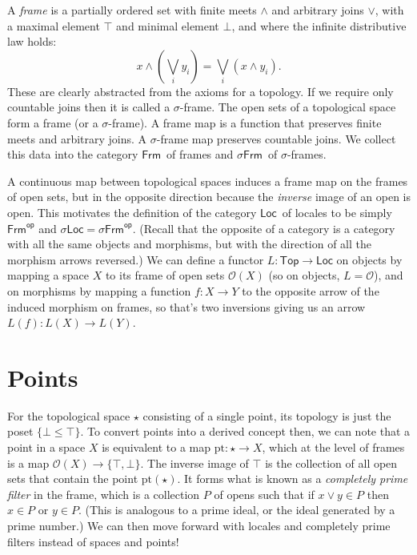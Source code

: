 \documentclass[12pt]{extarticle}
\newcommand{\op}[1]{#1^{\textsf{op}}}
\newcommand{\bottom}{\ensuremath{\bot}}
\newcommand{\Frm}{\ensuremath{\mathsf{Frm}}}
\newcommand{\sFrm}{\ensuremath{\mathsf{\sigma Frm}}}
\newcommand{\Locale}{\ensuremath{\mathsf{Loc}}}
\newcommand{\Topcat}{\ensuremath{\mathsf{Top}}}
\newcommand{\slocale}{\ensuremath{\mathsf{\sigma Loc}}}
\renewcommand{\o}{\ensuremath{\mathcal{O}}}
\begin{document}
A \emph{frame} is a partially ordered set with finite meets $\wedge$ and arbitrary joins $\vee$, with a maximal element $\top$ and minimal element $\bottom$, and where the infinite distributive law holds: $$x \wedge (\bigvee_i y_i)=\bigvee_i (x\wedge y_i).$$ These are clearly abstracted from the axioms for a topology. If we require only countable joins then it is called a $\sigma$-frame. The open sets of a topological space form a frame (or a $\sigma$-frame). A frame map is a function that preserves finite meets and arbitrary joins. A $\sigma$-frame map preserves countable joins. We collect this data into the category \Frm\ of frames and \sFrm\ of $\sigma$-frames.

A continuous map between topological spaces induces a frame map on the frames of open sets, but in the opposite direction because the \emph{inverse} image of an open is open. This motivates the definition of the category \Locale\ of locales to be simply $\op{\Frm}$ and $\slocale=\op{\sFrm}$. (Recall that the opposite of a category is a category with all the same objects and morphisms, but with the direction of all the morphism arrows reversed.) We can define a functor $L:\Topcat\to\Locale$ on objects by mapping a space $X$ to its frame of open sets $\o(X)$ (so on objects, $L=\o$), and on morphisms by mapping a function $f:X\to Y$ to the opposite arrow of the induced morphism on frames, so that's two inversions giving us an arrow $L(f):L(X)\to L(Y)$. 

\section{Points}

For the topological space $\star$ consisting of a single point, its topology is just the poset $\{\bot \leq \top\}$. To convert points into a derived concept then, we can note that a point in a space $X$ is equivalent to a map $\mathrm{pt}:\star\to X$, which at the level of frames is a map $\o(X)\to\{\top, \bot\}$. The inverse image of $\top$ is the collection of all open sets that contain the point $\mathrm{pt}(\star)$. It forms what is known as a \emph{completely prime filter} in the frame, which is a collection $P$ of opens such that if $x\vee y\in P$ then $x\in P$ or $y\in P$. (This is analogous to a prime ideal, or the ideal generated by a prime number.) We can then move forward with locales and completely prime filters instead of spaces and points!
\end{document}
